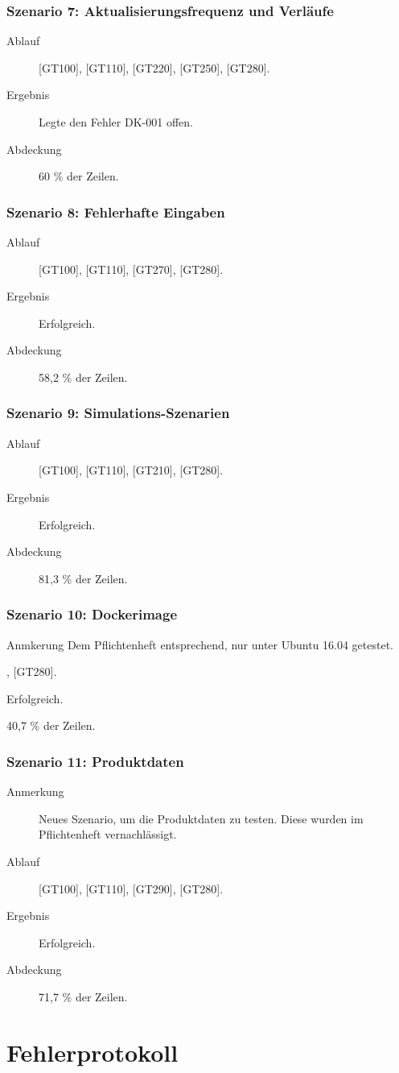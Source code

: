 \documentclass[parskip=full]{scrartcl}
\begin{document}
\subsubsection{Szenario 7: Aktualisierungsfrequenz und Verläufe}
\begin{description}
	\item[Ablauf] [GT100], [GT110], [GT220], [GT250], [GT280].
	\item[Ergebnis] Legte den Fehler DK-001 offen.
	\item[Abdeckung] 60 \% der Zeilen.
\end{description}

\subsubsection{Szenario 8: Fehlerhafte Eingaben}
\begin{description}
	\item[Ablauf] [GT100], [GT110], [GT270], [GT280].
	\item[Ergebnis] Erfolgreich.
	\item[Abdeckung] 58,2 \% der Zeilen.
\end{description}

\subsubsection{Szenario 9: Simulations-Szenarien}
\begin{description}
	\item[Ablauf] [GT100], [GT110], [GT210], [GT280].
	\item[Ergebnis] Erfolgreich.
	\item[Abdeckung] 81,3 \% der Zeilen.
\end{description}

\subsubsection{Szenario 10: Dockerimage}
\begin{description}
	\item{Anmkerung} Dem Pflichtenheft entsprechend, nur unter Ubuntu 16.04 getestet.
	\item[Ablauf] [GT130], [GT280].
	\item[Ergebnis] Erfolgreich.
	\item[Abdeckung] 40,7 \% der Zeilen.
\end{description}

\subsubsection{Szenario 11: Produktdaten}
\begin{description}
	\item[Anmerkung] Neues Szenario, um die Produktdaten zu testen. Diese wurden im Pflichtenheft vernachlässigt.
	\item[Ablauf] [GT100], [GT110], [GT290], [GT280].
	\item[Ergebnis] Erfolgreich.
	\item[Abdeckung] 71,7 \% der Zeilen.
\end{description}

\section{Fehlerprotokoll}

\pagebreak
{}
{}
\listoffigures
\end{document}
